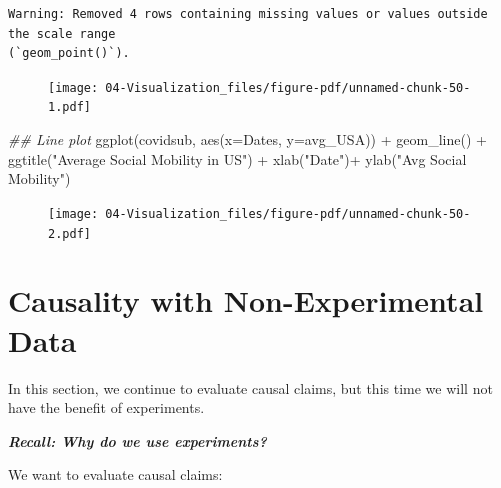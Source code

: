 \documentclass[
  letterpaper,
  DIV=11,
  numbers=noendperiod]{scrreprt}
\newenvironment{Shaded}{\begin{snugshade}}{\end{snugshade}}
\newcommand{\AttributeTok}[1]{\textcolor[rgb]{0.40,0.45,0.13}{#1}}
\newcommand{\DocumentationTok}[1]{\textcolor[rgb]{0.37,0.37,0.37}{\textit{#1}}}
\newcommand{\FunctionTok}[1]{\textcolor[rgb]{0.28,0.35,0.67}{#1}}
\newcommand{\NormalTok}[1]{\textcolor[rgb]{0.00,0.23,0.31}{#1}}
\newcommand{\SpecialCharTok}[1]{\textcolor[rgb]{0.37,0.37,0.37}{#1}}
\newcommand{\StringTok}[1]{\textcolor[rgb]{0.13,0.47,0.30}{#1}}
\begin{document}
\begin{verbatim}
Warning: Removed 4 rows containing missing values or values outside the scale range
(`geom_point()`).
\end{verbatim}

\begin{figure}[H]

{\centering \texttt{[image: 04-Visualization\_files/figure-pdf/unnamed-chunk-50-1.pdf]}

}

\end{figure}

\begin{Shaded}
\begin{Highlighting}[]
\DocumentationTok{\#\# Line plot}
\FunctionTok{ggplot}\NormalTok{(covidsub, }\FunctionTok{aes}\NormalTok{(}\AttributeTok{x=}\NormalTok{Dates, }\AttributeTok{y=}\NormalTok{avg\_USA)) }\SpecialCharTok{+}
  \FunctionTok{geom\_line}\NormalTok{() }\SpecialCharTok{+}
  \FunctionTok{ggtitle}\NormalTok{(}\StringTok{"Average Social Mobility in US"}\NormalTok{) }\SpecialCharTok{+}
  \FunctionTok{xlab}\NormalTok{(}\StringTok{"Date"}\NormalTok{)}\SpecialCharTok{+}
  \FunctionTok{ylab}\NormalTok{(}\StringTok{"Avg Social Mobility"}\NormalTok{)}
\end{Highlighting}
\end{Shaded}

\begin{figure}[H]

{\centering \texttt{[image: 04-Visualization\_files/figure-pdf/unnamed-chunk-50-2.pdf]}

}

\end{figure}


\hypertarget{causalityii}{%
\chapter{Causality with Non-Experimental Data}\label{causalityii}}

In this section, we continue to evaluate causal claims, but this time we
will not have the benefit of experiments.

\textbf{\emph{Recall: Why do we use experiments?}}

We want to evaluate causal claims:
\end{document}
